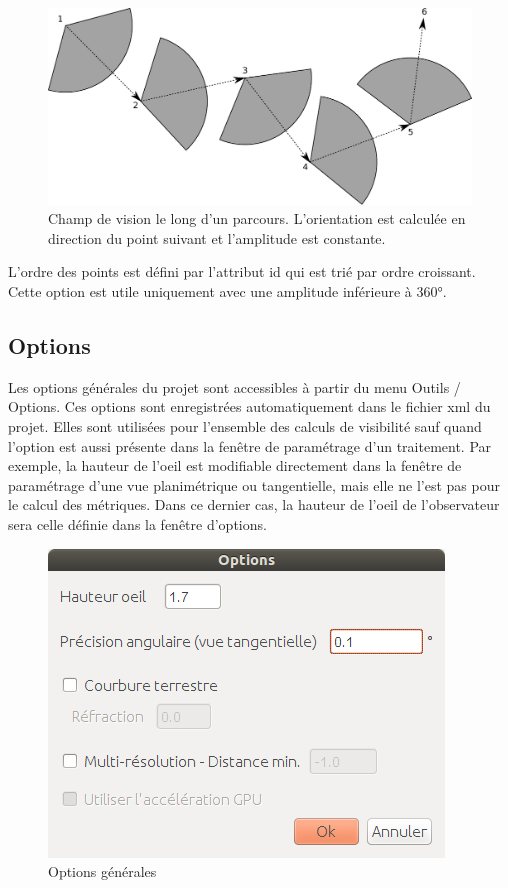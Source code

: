 \documentclass{report}
\begin{document}
\begin{figure}[H]
	\includegraphics[scale=0.8]{img/path_orien.pdf} 
	\caption{Champ de vision le long d'un parcours. L'orientation est calculée en direction du point suivant et l'amplitude est constante.}
	\label{path_orien}
\end{figure}

L'ordre des points est défini par l'attribut id qui est trié par ordre croissant.
Cette option est utile uniquement avec une amplitude inférieure à 360°.


\subsection{Options}
\label{options}
Les options générales du projet sont accessibles à partir du menu Outils / Options.
Ces options sont enregistrées automatiquement dans le fichier xml du projet. Elles sont utilisées pour l'ensemble des calculs de visibilité sauf quand l'option est aussi présente dans la fenêtre de paramétrage d'un traitement. Par exemple, la hauteur de l'oeil est modifiable directement dans la fenêtre de paramétrage d'une vue planimétrique ou tangentielle, mais elle ne l'est pas pour le calcul des métriques. Dans ce dernier cas, la hauteur de l'oeil de l'observateur sera celle définie dans la fenêtre d'options.

\begin{figure}[H]
	\includegraphics[scale=0.5]{img/options-fr.png} 
	\caption{Options générales}
\end{figure}
\end{document}
